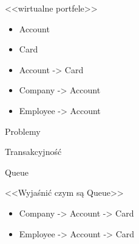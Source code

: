 \documentclass{beamer}
\begin{document}
\begin{frame}{}
	\begin{center}
		\Huge{<<wirtualne portfele>>}
	\end{center}
\end{frame}

\begin{frame}{}
	\begin{huge}
		\begin{itemize}[<+->]
			\item Account
			\item Card
		\end{itemize}
	\end{huge}
\end{frame}

\begin{frame}{}
	\begin{huge}
		\begin{itemize}[<+->]
			\item Account -> Card
			\item Company -> Account
			\item Employee -> Account
		\end{itemize}
	\end{huge}
\end{frame}

\begin{frame}{}
	\begin{center}
		\Huge{Problemy}
	\end{center}
\end{frame}

\begin{frame}{}
	\begin{center}
		\Huge{Transakcyjność}
	\end{center}
\end{frame}

\begin{frame}{}
	\begin{center}
		\Huge{Queue}
	\end{center}
\end{frame}

\begin{frame}{}
	\begin{center}
		\Huge{<<Wyjaśnić czym są Queue>>}
	\end{center}
\end{frame}

\begin{frame}{}
	\begin{huge}
		\begin{itemize}[<+->]
			\item Company -> Account -> Card
			\item Employee -> Account -> Card
		\end{itemize}
	\end{huge}
\end{frame}
\end{document}
